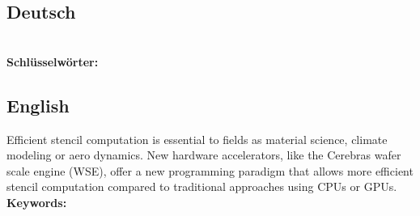 \begin{otherlanguage}{ngerman}
\section*{Deutsch}
\blindtext[2]
\\[2ex]
\textbf{Schlüsselwörter:} \itshape \germankeywords
\end{otherlanguage}
\begin{otherlanguage}{english}
\section*{English}
Efficient stencil computation is essential to fields as material science, climate modeling or aero dynamics. New hardware accelerators, like the Cerebras wafer scale engine (WSE), offer a new programming paradigm that allows more efficient stencil computation compared to traditional approaches using CPUs or GPUs.
\\[2ex]
\textbf{Keywords:} \itshape \englishkeywords
\end{otherlanguage}